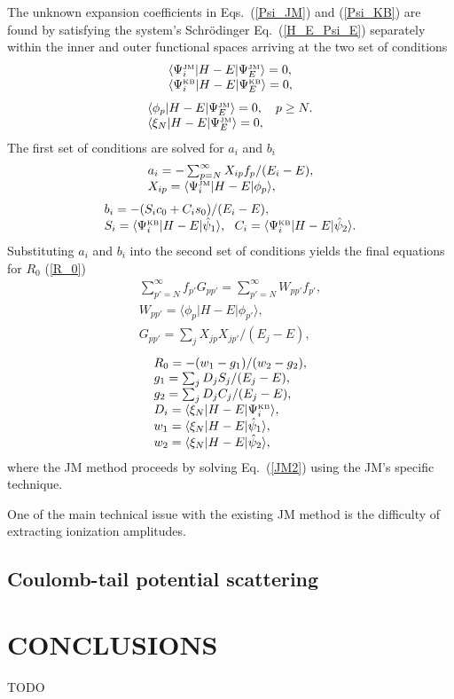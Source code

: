 \documentclass[aip
, pra
, showpacs
, aps
, twocolumn
, groupedaddress
, floatfix
]{revtex4}
\newcommand{\beq}{\begin{equation}}
\newcommand{\eeq}{\end{equation}}
\newcommand{\barr}{\begin{array}}
\newcommand{\earr}{\end{array}}
\newcommand{\JM}{\mbox{\tiny{JM}}}
\newcommand{\KB}{\mbox{\tiny{KB}}}
\begin{document}
The unknown expansion coefficients in Eqs.~(\ref{Psi_JM}) and (\ref{Psi_KB})
are found by satisfying the system's  Schr\"odinger Eq.~(\ref{H_E_Psi_E})
separately within the inner and outer functional spaces
arriving at the two set of conditions
\beq \barr{l}
\langle\Psi_i^{\JM}|H-E|\Psi_E^{\JM}\rangle= 0, \\
\langle\Psi_i^{\KB}|H-E|\Psi_E^{\KB}\rangle=0,
\earr \eeq
\beq \barr{l}
\langle\phi_p|H-E|\Psi_E^{\JM}\rangle=0 , \ \ \ p \geq N.\\
\langle \xi_N |H-E|\Psi_E^{\JM}\rangle=0,
\earr \eeq
The first set of conditions are solved for $a_i$ and $b_i$
\beq \barr{l}
a_i = - \sum_{p=N}^{\infty} X_{ip} f_p / (E_i-E),\\
X_{ip}=  \langle\Psi_i^{\JM}|H-E| \phi_p \rangle ,\\
\earr \eeq
\beq \barr{l}
b_i = - (S_i c_0 + C_i s_0) / (E_i-E), \\
S_i = \langle\Psi_i^{\KB}|H-E|  \hat{\psi}_1 \rangle, \ \
C_i = \langle\Psi_i^{\KB}|H-E|  \hat{\psi}_2 \rangle.
\earr \eeq
Substituting $a_i$ and $b_i$ into the second set of conditions yields the final equations for $R_0$ (\ref{R_0})
\beq \barr{l}
\sum_{p'=N}^{\infty} f_{p'}  G_{pp'} = \sum_{p'=N}^{\infty} W_{pp'} f_{p'},\\
W_{pp'}  = \langle \phi_p | H-E | \phi_{p'} \rangle,\\
G_{pp'}= \sum_j X_{jp} X_{jp'}/(E_j-E),
\label{JM2} \earr \eeq
\beq \barr{l}
R_0 = -(w_1 - g_1) / (w_2 - g_2),\\
g_1= \sum_j D_{j} S_{j}/(E_j-E),\\
g_2= \sum_j D_{j} C_{j}/(E_j-E),\\
D_i = \langle \xi_N |H-E| \Psi_i^{\KB} \rangle, \\
w_1  = \langle \xi_N |H-E| \hat{\psi}_1 \rangle,\\
w_2 = \langle \xi_N |H-E| \hat{\psi}_2 \rangle,
\earr \eeq
where the JM method proceeds by solving Eq.~(\ref{JM2}) using the JM's specific technique.




One of the main technical issue with the existing JM method is the difficulty of extracting ionization amplitudes.


\subsection{Coulomb-tail potential scattering}



\section{CONCLUSIONS}
TODO


\begin{acknowledgments}
\end{acknowledgments}





%
\end{document}
